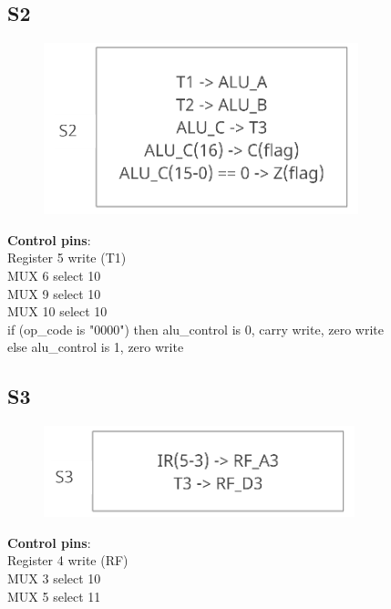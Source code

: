 \documentclass[11pt, fleqn]{article}
\begin{document}
\subsection*{S2}
\begin{figure}[H]
    \centering
    \includegraphics{DataPath/DataPath_S2.PNG}
\end{figure}
\textbf{Control pins}: \\
Register 5 write (T1) \\
MUX 6 select 10 \\
MUX 9 select 10 \\
MUX 10 select 10 \\
if (op\_code is "0000") then alu\_control is 0, carry write, zero write \\
else alu\_control is 1, zero write \\

\subsection*{S3}
\begin{figure}[H]
    \centering
    \includegraphics{DataPath/DataPath_S3.PNG}
\end{figure}
\textbf{Control pins}: \\
Register 4 write (RF) \\
MUX 3 select 10 \\
MUX 5 select 11 \\
\end{document}
